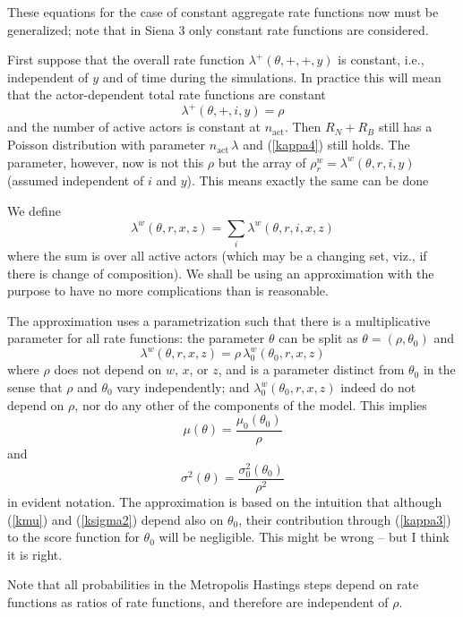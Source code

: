 \documentclass[a4paper,12pt,fleqn]{article}
\begin{document}
\begin{appendices}
These equations for the case of constant aggregate rate functions
now must be generalized;
note that in Siena 3 only constant rate functions are
considered.

First suppose that the overall rate function $ \lambda^+(\theta, +,+, y)$
is constant, i.e., independent of $y$ and of time during the simulations.
In practice this will mean that the actor-dependent
total rate functions are constant
\[
   \lambda^+(\theta, +,i, y) = \rho
\]
and the number of active actors is constant at $n_{\text{act}}$.
Then $R_N + R_B$ still has a Poisson distribution
with parameter $n_{\text{act}}\,\lambda$
and (\ref{kappa4}) still holds.
The parameter, however, now is not this $\rho$ but
the array of $\rho^w_r = \lambda^w(\theta, r, i, y)$ (assumed independent
of $i$ and $y$).
This means exactly the same can be done

We define
\begin{equation}
  \lambda^w(\theta,r,x,z) = \sum_i \lambda^w(\theta,r,i,x,z)
\end{equation}
where the sum is over all active actors (which may be a changing set, viz., if there is
change of composition).
We shall be using an approximation with the purpose to have no more complications
than is reasonable.

The approximation uses a parametrization
such that there is a multiplicative parameter for all rate functions:
the parameter $\theta$ can be split as $\theta = (\rho, \theta_0)$ and
\begin{equation}
  \lambda^w(\theta,r,x,z) = \rho\,  \lambda_0^w(\theta_0,r,x,z)
\end{equation}
where $\rho$ does not depend on $w$, $x$, or $z$, and is a parameter distinct from $\theta_0$
in the sense that $\rho$ and $\theta_0$ vary independently;
and $ \lambda_0^w(\theta_0,r,x,z)$ indeed do not depend on $\rho$,
nor do any other of the components of the model.
This implies
\[
 \mu(\theta) = \frac{\mu_0(\theta_0)}{\rho}
\]
and
\[
 \sigma^2(\theta) = \frac{\sigma^2_0(\theta_0)}{\rho^2}
\]
in evident notation.
The approximation is based on the intuition that although (\ref{kmu}) and
(\ref{ksigma2}) depend also on $\theta_0$,
their contribution through (\ref{kappa3}) to the score function
for $\theta_0$ will be negligible.
This might be wrong -- but I think it is right.

Note that all probabilities in the Metropolis Hastings steps depend on
rate functions as ratios of rate functions,
and therefore are independent of $\rho$.


\end{appendices}
\end{document}
